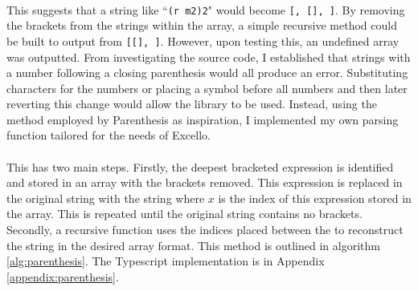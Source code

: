 \paragraph{} This suggests that a string like ``\texttt{(r m2)2}" would become \texttt{[\upquote{(}, [], ]}.  By removing the brackets from the strings within the array, a simple recursive method could be built to output \texttt{} from \texttt{[[], ]}. However, upon testing this, an undefined array was outputted. From investigating the source code, I established that strings with a number following a closing parenthesis would all produce an error. Substituting characters for the numbers or placing a symbol before all numbers and then later reverting this change would allow the library to be used. Instead, using the method employed by Parenthesis as inspiration, I implemented my own parsing function tailored for the needs of Excello.

\paragraph{} This has two main steps. Firstly, the deepest bracketed expression is identified and stored in an array with the brackets removed. This expression is replaced in the original string with the string  where $x$ is the index of this expression stored in the array. This is repeated until the original string contains no brackets. Secondly, a recursive function uses the indices placed between the \texttt{\upquote{\_\_\_}} to reconstruct the string in the desired array format. This method is outlined in algorithm \ref{alg:parenthesis}. The Typescript implementation is in Appendix \ref{appendix:parenthesis}.

